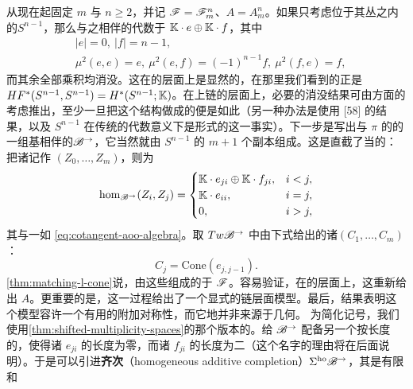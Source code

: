 从现在起固定 $m$ 与 $n\ge 2$，并记 $\mathscr{F}=\mathscr{F}^n_m$、$A=A^n_m$。如果只考虑位于其\trCotangent{}丛之内的\trZeroSection{}$S^{n-1}$，那么与之相伴的\trFukaya\trAinfty{}代数\trQuasiisomorphic{}于 $\mathbb{K}\cdot e\oplus\mathbb{K}\cdot f$，其中
\begin{equation}\label{eq:cotangent-aoo-algebra}
\begin{split}
&|e|=0,\ |f|=n-1,\\
&\mu^2(e,e)=e,\ \mu^2(e,f)=(-1)^{n-1}f,\ \mu^2(f,e)=f,
\end{split}
\end{equation}
而其余全部乘积均消没。这在\trCohomology{}的层面上是显然的，在那里我们看到的正是 $HF^*(S^{n-1},S^{n-1})=H^*(S^{n-1};\mathbb{K})$。在上链的层面上，必要的消没结果可由\trDegree{}方面的考虑推出，至少一旦把这个\trAinfty{}结构做成\trStrictlyUnital{}的便是如此（另一种办法是使用 [58] 的结果，以及 $S^{n-1}$ 在传统的代数\trTopology{}意义下是形式的这一事实）。下一步是写出与 $\pi$ 的\trVanishingCycle{}的一组基相伴的\trDirected\trAinfty\trCategory{}$\mathscr{B}^{\rightarrow}$，它当然就由 $S^{n-1}$ 的 $m+1$ 个副本组成。这是直截了当的：把诸\trObject{}记作 $(Z_0,\ldots,Z_m)$，则\trMorphism{}为
\begin{equation}\label{eq:directed-category-hom}
\hom_{\mathscr{B}^{\rightarrow}}(Z_i,Z_j)=
\begin{cases}
\mathbb{K}\cdot e_{ji}\oplus\mathbb{K}\cdot f_{ji}, & i<j,\\
\mathbb{K}\cdot e_{ii}, & i=j,\\
0, & i>j,
\end{cases}
\end{equation}
其\trDegree{}与\trComposition{}一如 \eqref{eq:cotangent-aoo-algebra}。取 $Tw\mathscr{B}^{\rightarrow}$ 中由下式给出的诸\trObject{}$(C_1,\ldots,C_m)$：
\begin{equation}\label{eq:cone-objects}
C_j=\mathrm{Cone}(e_{j,j-1}).
\end{equation}
\cref{thm:matching-l-cone}说，由这些\trObject{}组成的\trFullSubcategory{}\trQuasiisomorphic{}于 $\mathscr{F}$。容易验证，在\trCohomology{}的层面上，这重新给出 $A$。更重要的是，这一过程给出了一个显式的链层面模型。最后，结果表明这个模型容许一个有用的附加对称性，而它\trApriori{}地并非来源于几何。
为简化记号，我们使用\cref{thm:shifted-multiplicity-spaces}的那个版本的\trTwistedComplex。给 $\mathscr{B}^{\rightarrow}$ 配备另一个按长度的\trGrading，使得诸 $e_{ji}$ 的长度为零，而诸 $f_{ji}$ 的长度为二（这个名字的理由将在后面说明）。于是可以引进\textbf{齐次\trAdditive\trCompletion{}}（homogeneous additive completion）$\Sigma^{\mathrm{ho}}\mathscr{B}^{\rightarrow}$，其\trObject{}是有限和
